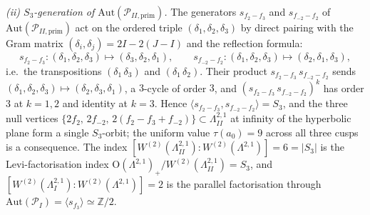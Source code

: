 \begin{lemma}
\emph{(ii) $S_3$-generation of $\mathrm{Aut}(\mathcal{P}_{II,\mathrm{prim}})$.}
The generators $s_{f_2 - f_3}$ and $s_{f_{-2} - f_2}$ of
$\mathrm{Aut}(\mathcal{P}_{II,\mathrm{prim}})$ act on the ordered
triple $(\delta_1, \delta_2, \delta_3)$ by direct pairing with the
Gram matrix $(\delta_i, \delta_j) = 2I - 2(J - I)$ and the reflection
formula:
\[
s_{f_2 - f_3}\colon (\delta_1, \delta_2, \delta_3) \mapsto
(\delta_3, \delta_2, \delta_1), \qquad
s_{f_{-2} - f_2}\colon (\delta_1, \delta_2, \delta_3) \mapsto
(\delta_2, \delta_1, \delta_3),
\]
i.e.\ the transpositions $(\delta_1\,\delta_3)$ and
$(\delta_1\,\delta_2)$. Their product
$s_{f_2 - f_3}\,s_{f_{-2} - f_2}$ sends
$(\delta_1, \delta_2, \delta_3) \mapsto (\delta_2, \delta_3, \delta_1)$,
a $3$-cycle of order $3$, and
$(s_{f_2 - f_3}\,s_{f_{-2} - f_2})^k$ has order $3$ at
$k = 1, 2$ and identity at $k = 3$. Hence
$\langle s_{f_2 - f_3}, s_{f_{-2} - f_2}\rangle = S_3$, and the
three null vertices
$\{2f_2,\,2f_{-2},\,2(f_2 - f_3 + f_{-2})\} \subset \Lambda^{2,1}_{II}$
at infinity of the hyperbolic plane form a single $S_3$-orbit; the
uniform value $\tau(a_0) = 9$ across all three cusps is a
consequence. The index
$[W^{(2)}(\Lambda^{2,1}_{II}) : W^{(2)}(\Lambda^{2,1})] = 6 = |S_3|$
is the Levi-factorisation index
$\mathrm{O}(\Lambda^{2,1})_+ / W^{(2)}(\Lambda^{2,1}_{II}) = S_3$,
and $[W^{(2)}(\Lambda^{2,1}_I) : W^{(2)}(\Lambda^{2,1})] = 2$ is
the parallel factorisation through $\mathrm{Aut}(\mathcal{P}_I) =
\langle s_{f_3}\rangle \simeq \mathbb{Z}/2$.


\end{lemma}
